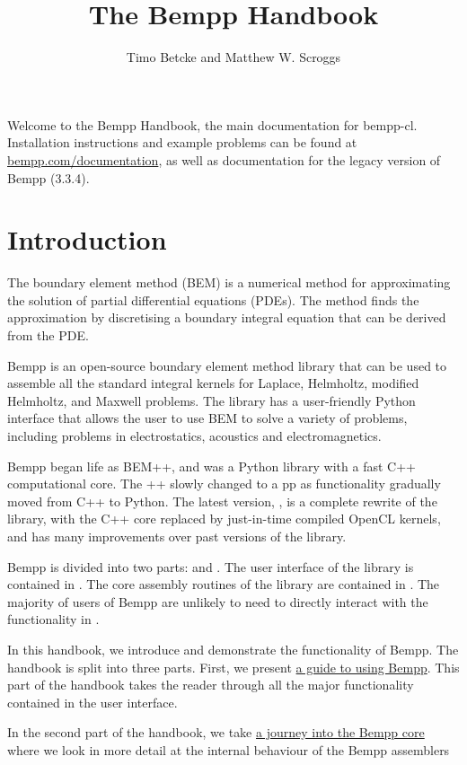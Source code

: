 \documentclass[a4paper]{book}
\title{The Bempp Handbook}
\author{Timo Betcke and Matthew W. Scroggs}
\begin{document}
\maketitle


Welcome to the Bempp Handbook, the main documentation for bempp-cl.
Installation instructions and example problems can be found at
\href{https://bempp.com/documentation}{bempp.com/documentation}, as well as documentation
for the legacy version of Bempp (3.3.4).


\part{Introduction}


The boundary element method (BEM) is a numerical method for approximating the solution of partial differential equations (PDEs).
The method finds the approximation by discretising a boundary integral equation that can be derived from the PDE.

Bempp is an open-source boundary element method library that can be used to assemble all the standard integral kernels for
Laplace, Helmholtz, modified Helmholtz, and Maxwell problems. The library has a user-friendly Python interface that allows the
user to use BEM to solve a variety of problems, including problems in electrostatics, acoustics and electromagnetics.

Bempp began life as BEM++, and was a Python library with a fast C++ computational core. The ++ slowly changed to a pp as
functionality gradually moved from C++ to Python. The latest version, , is a complete rewrite of the library, with
the C++ core replaced by just-in-time compiled OpenCL kernels, and has many improvements over past versions of the library.

Bempp is divided into two parts:  and .
The user interface of the library is contained in .
The core assembly routines of the library are contained in . The majority of users of Bempp are unlikely to need
to directly interact with the functionality in .

In this handbook, we introduce and demonstrate the functionality of Bempp. The handbook is split into three parts.
First, we present \href{api/index.md}{a guide to using Bempp}. This part of the handbook takes the reader
through all the major functionality contained in the  user interface.

In the second part of the handbook, we take \href{core/index.md}{a journey into the Bempp core} where we look in more detail
at the internal behaviour of the Bempp assemblers
\end{document}
